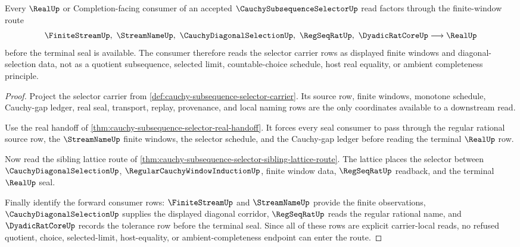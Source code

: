 \begin{theorem}
\label{thm:cauchy-subsequence-selector-forward-link}
Every $\RealUp$ or Completion-facing consumer of an accepted $\CauchySubsequenceSelectorUp$ read factors through the finite-window route
$$
\FiniteStreamUp,\ \StreamNameUp,\ \CauchyDiagonalSelectionUp,\ \RegSeqRatUp,\ \DyadicRatCoreUp \longrightarrow \RealUp
$$
before the terminal seal is available. The consumer therefore reads the selector carrier rows as displayed finite windows and diagonal-selection data, not as a quotient subsequence, selected limit, countable-choice schedule, host real equality, or ambient completeness principle.
\end{theorem}
\begin{proof}
Project the selector carrier from \autoref{def:cauchy-subsequence-selector-carrier}. Its source row, finite windows, monotone schedule, Cauchy-gap ledger, real seal, transport, replay, provenance, and local naming rows are the only coordinates available to a downstream read.

Use the real handoff of \autoref{thm:cauchy-subsequence-selector-real-handoff}. It forces every seal consumer to pass through the regular rational source row, the $\StreamNameUp$ finite windows, the selector schedule, and the Cauchy-gap ledger before reading the terminal $\RealUp$ row.

Now read the sibling lattice route of \autoref{thm:cauchy-subsequence-selector-sibling-lattice-route}. The lattice places the selector between $\CauchyDiagonalSelectionUp$, $\RegularCauchyWindowInductionUp$, finite window data, $\RegSeqRatUp$ readback, and the terminal $\RealUp$ seal.

Finally identify the forward consumer rows: $\FiniteStreamUp$ and $\StreamNameUp$ provide the finite observations, $\CauchyDiagonalSelectionUp$ supplies the displayed diagonal corridor, $\RegSeqRatUp$ reads the regular rational name, and $\DyadicRatCoreUp$ records the tolerance row before the terminal seal. Since all of these rows are explicit carrier-local reads, no refused quotient, choice, selected-limit, host-equality, or ambient-completeness endpoint can enter the route.
\end{proof}
